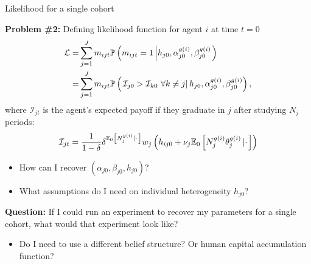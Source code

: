 \documentclass[compress, 8pt]{beamer}
\begin{document}
\begin{frame}{Likelihood for a single cohort}\label{likelihood}

\textbf{Problem \#2:} Defining likelihood function for agent $i$ at time $t=0$
\begin{align*}
    \mathcal{L} =& \sum_{j=1}^J m_{ijt} \mathbb{P} \left( m_{ijt} = 1 \left\vert h_{j0}, \alpha_{j0}^{g(i)}, \beta_{j0}^{g(i)} \right. \right)
    \\
    =& 
    \sum_{j=1}^J
    m_{ijt} \mathbb{P} \left(  \left. 
    \mathcal{I}_{j0} > \mathcal{I}_{k0} \ \forall k \neq j
     \right\vert h_{j0}, \alpha_{j0}^{g(i)}, \beta_{j0}^{g(i)} \right),
\end{align*}
where $\mathcal{I}_{jt}$ is the agent's expected payoff if they graduate in $j$ after studying $N_j$ periods:
\hyperlink{model_optimal_rule}{}
\begin{equation*}
    \mathcal{I}_{jt} 
    = 
    \frac{1}{1 - \delta} 
    \delta^{\mathbb{E}_0 \left[ N_j^{g(i)} \left\vert \cdot \right. \right]}
    w_j
    \left( 
        h_{ij0} + \nu_j \mathbb{E}_0 \left[ N_j^{g(i)} \theta_j^{g(i)} \left\vert \cdot \right. \right]
     \right)
\end{equation*}
\begin{itemize}
    \item How can I recover $(\alpha_{j0}, \beta_{j0}, h_{j0})$?
    \item What assumptions do I need on individual heterogeneity $h_{j0}$?
\end{itemize}

\vspace{2ex}
\textbf{Question:} If I could run an experiment to recover my parameters for a single cohort, what would that experiment look like? 
\begin{itemize}
    \item Do I need to use a different belief structure? Or human capital accumulation function?
\end{itemize}

\end{frame}



\end{document}
